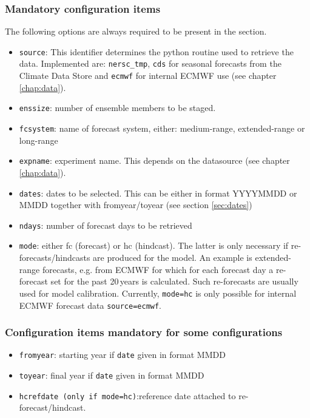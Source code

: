 \documentclass[DIV=10, parskip=full]{scrreprt}
\newcommand{\notimplement}[1]{#1}
\begin{document}
\subsubsection{Mandatory configuration items}
The following options are always required to be present in the section.
\begin{itemize}
 \item \texttt{source}: This identifier determines the python routine used to retrieve the data. Implemented are:  \texttt{nersc\_tmp}, \texttt{cds} for seasonal forecasts from the Climate Data Store and \texttt{ecmwf} for internal ECMWF use (see chapter \ref{chap:data}).
 \item \texttt{enssize}: number of ensemble members to be staged. 
 \item \texttt{fcsystem}: name of forecast system, either: medium-range, extended-range or long-range
 \item \texttt{expname}: experiment name. This depends on the datasource (see chapter \ref{chap:data}).
 \item \texttt{dates}: dates to be selected. This can be either in format YYYYMMDD or MMDD together with fromyear/toyear (see section \ref{sec:dates})
 \item \texttt{ndays}: number of forecast days to be retrieved
 \item \texttt{mode}: either fc (forecast) or hc (hindcast). The latter is only necessary if re-forecasts/hindcasts are produced for the model. An example is extended-range forecasts, e.g. from ECMWF for which for each forecast day a re-forecast set for the past 20\,years is calculated. Such re-forecasts are usually used for model calibration. \notimplement{Currently, \texttt{mode=hc} is only possible for internal ECMWF forecast data \texttt{source=ecmwf}}.

\end{itemize}

\subsubsection{Configuration items mandatory for some configurations}
\begin{itemize}
	 \item \texttt{fromyear}: starting year if \texttt{date} given in format MMDD
	\item \texttt{toyear}: final year if \texttt{date} given in format MMDD
 \item \texttt{hcrefdate (only if mode=hc)}:reference date attached to re-forecast/hindcast. 
\end{itemize}
\end{document}
